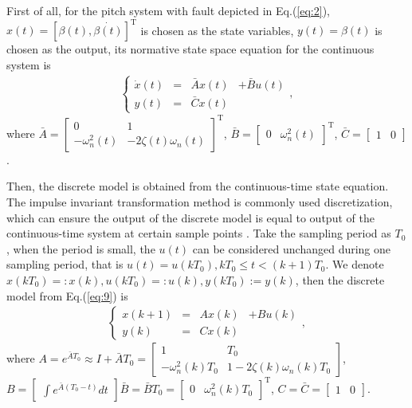 \documentclass{article}
\begin{document}
First of all, for the pitch system with fault depicted in Eq.(\ref{eq:2}),
$x(t)=[\beta(t), \dot{\beta(t)}]^\mathrm{T}$ is chosen as the state variables,
$y(t)=\beta(t)$ is chosen as the output, its normative state space equation for
the continuous system is
\begin{eqnarray}
  \left\{\begin{aligned}
    \dot{x}(t) &=& \bar{A}x(t) &+ \bar{B}u(t)  \\
    y(t)       &=& \bar{C}x(t) &
  \end{aligned},
  \right.                    \label{eq:9}
\end{eqnarray}
where $\bar{A}=\begin{bmatrix}
  0              & 1                      \\
  -\omega^2_n(t) & -2\zeta(t)\omega_n(t)
\end{bmatrix}^\mathrm{T}$,
$\bar{B}=\begin{bmatrix}
  0 & \omega^2_n(t)
\end{bmatrix}^\mathrm{T}$,
$\bar{C}=\begin{bmatrix}
  1 & 0
\end{bmatrix}$.


Then, the discrete model is obtained from the continuous-time state equation.
The impulse invariant transformation
method is commonly used discretization, which can ensure the output of the discrete model
is equal to output of
the continuous-time system at certain
sample points \cite{ref:16}. Take the sampling period as $T_0$, when the period is
small, the $u(t)$ can be considered unchanged during one sampling period, that is
$u(t)=u(kT_0), kT_0\leq{}t<(k+1)T_0$. We denote $x(kT_0)=:x(k),u(kT_0)=:u(k),y(kT_0):=y(k)$,
then the discrete model from Eq.(\ref{eq:9}) is
\begin{eqnarray}
  \left\{\begin{aligned}
    x(k+1)     &=& Ax(k) &+ Bu(k)  \\
    y(k)       &=& Cx(k) &
  \end{aligned},
  \right.                    \label{eq:10}
\end{eqnarray}
where $A=e^{\bar{A}T_0} \approx I+\bar{A}T_0 =
\begin{bmatrix}
  1                   &    T_0      \\
  -\omega^2_n(k)T_0   &    1-2\zeta(k)\omega_n(k)T_0
\end{bmatrix}$,
$B=
\begin{bmatrix}
  \int{}e^{\bar{A}(T_0-t)}dt
\end{bmatrix}\bar{B}=\bar{B}T_0=
\begin{bmatrix}
  0    &  \omega^2_n(k)T_0
\end{bmatrix}^\mathrm{T}$,
$C=\bar{C}=
\begin{bmatrix}
  1  &   0
\end{bmatrix}$.
\end{document}
